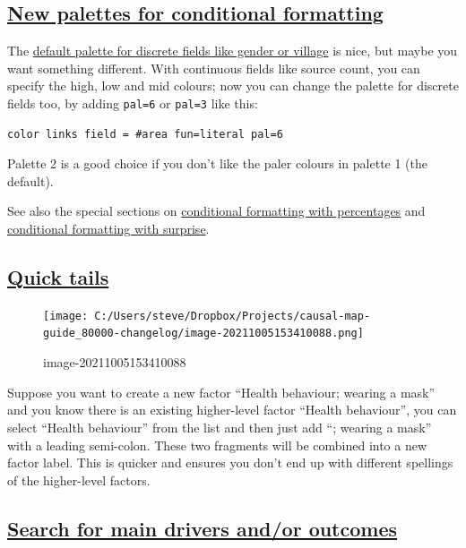 \documentclass[
]{book}
\begin{document}
\hypertarget{new-palettes-for-conditional-formatting}{%
\subsection{\texorpdfstring{\protect\hyperlink{xconditional-formats}{New palettes for conditional formatting}}{New palettes for conditional formatting}}\label{new-palettes-for-conditional-formatting}}

The \href{https://colorbrewer2.org/\#type=qualitative\&scheme=Set1\&n=9}{default palette for discrete fields like gender or village} is nice, but maybe you want something different. With continuous fields like source count, you can specify the high, low and mid colours; now you can change the palette for discrete fields too, by adding \texttt{pal=6} or \texttt{pal=3} like this:

\begin{verbatim}
color links field = #area fun=literal pal=6
\end{verbatim}

Palette 2 is a good choice if you don't like the paler colours in palette 1 (the default).

See also the special sections on \protect\hyperlink{percent}{conditional formatting with percentages} and \protect\hyperlink{xsurprise}{conditional formatting with surprise}.

\hypertarget{quick-tails}{%
\subsection{\texorpdfstring{\protect\hyperlink{xquick-tails}{Quick tails}}{Quick tails}}\label{quick-tails}}

\begin{figure}
\centering
\texttt{[image: C:/Users/steve/Dropbox/Projects/causal-map-guide\_80000-changelog/image-20211005153410088.png]}
\caption{image-20211005153410088}
\end{figure}

Suppose you want to create a new factor ``Health behaviour; wearing a mask'' and you know there is an existing higher-level factor ``Health behaviour'', you can select ``Health behaviour'' from the list and then just add ``; wearing a mask'' with a leading semi-colon. These two fragments will be combined into a new factor label. This is quicker and ensures you don't end up with different spellings of the higher-level factors.

\hypertarget{search-for-main-drivers-andor-outcomes}{%
\subsection{\texorpdfstring{\protect\hyperlink{howtotracepathsandrobustness}{Search for main drivers and/or outcomes}}{Search for main drivers and/or outcomes}}\label{search-for-main-drivers-andor-outcomes}}
\end{document}
